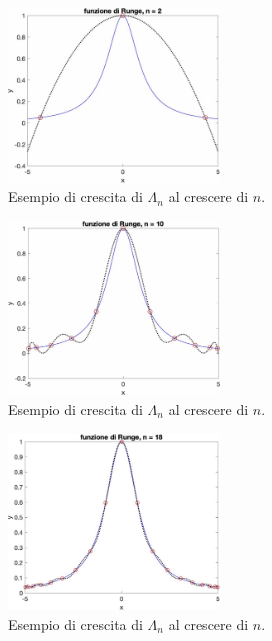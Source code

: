 \begin{figure}
    \centering
    \includegraphics[width=0.5\textwidth]{immagini/funzione_runge_ascisse_cheby_n=2.jpg}
    \caption{Esempio di crescita di $\Lambda_n$ al crescere di $n$.}\label{fig:funzione_runge_ascisse_cheby_n=2}
\end{figure}

\begin{figure}
    \centering
    \includegraphics[width=0.5\textwidth]{immagini/funzione_runge_ascisse_cheby_n=10.jpg}
    \caption{Esempio di crescita di $\Lambda_n$ al crescere di $n$.}\label{fig:funzione_runge_ascisse_cheby_n=10}
\end{figure}

\begin{figure}
    \centering
    \includegraphics[width=0.5\textwidth]{immagini/funzione_runge_ascisse_cheby_n=18.jpg}
    \caption{Esempio di crescita di $\Lambda_n$ al crescere di $n$.}\label{fig:funzione_runge_ascisse_cheby_n=18}
\end{figure}

